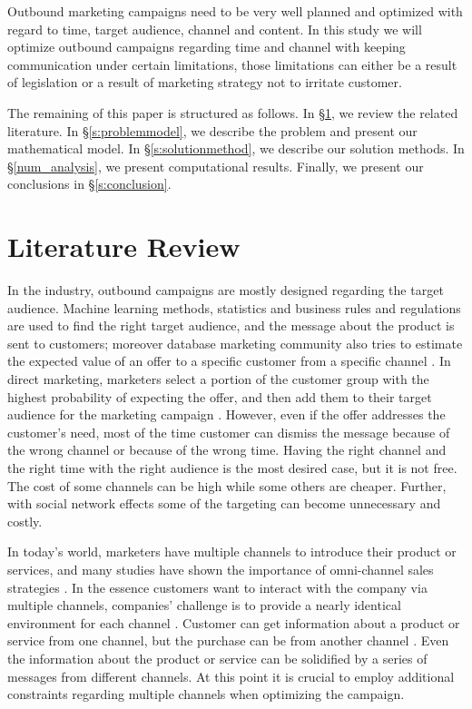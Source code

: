 \documentclass[11pt]{article}
\begin{document}
Outbound marketing campaigns need to be very well planned and optimized with regard to time, target audience, channel and content. In this study we will optimize outbound campaigns regarding time and channel with keeping communication under certain limitations, those limitations can either be a result of legislation or a result of marketing strategy not to irritate customer.

The remaining of this paper is structured as follows. In \S \ref{s:literature_review}, we review the related literature. In \S \ref{s:problemmodel}, we describe the problem and present our mathematical model. In \S \ref{s:solutionmethod}, we describe our solution methods. In \S \ref{num_analysis}, we present computational results. Finally, we present our conclusions in \S \ref{s:conclusion}.




\section{Literature Review}  \label{s:literature_review}

In the industry, outbound campaigns are mostly designed regarding the target audience. Machine learning methods, statistics and business rules and regulations are used to find the right target audience, and the message about the product is sent to customers; moreover database marketing community also tries to estimate the expected value of an offer to a specific customer from a specific channel \citep{cohen_exp, oliveira_hypr}. In direct marketing, marketers select a portion of the customer group with the highest probability of expecting the offer, and then add them to their target audience for the marketing campaign \citep{owczarczuk}. However, even if the offer addresses the customer’s need, most of the time customer can dismiss the message because of the wrong channel or because of the wrong time. Having the right channel and the right time with the right audience is the most desired case, but it is not free. The cost of some channels can be high while some others are cheaper. Further, with social network effects some of the targeting can become unnecessary and costly.

In today’s world, marketers have multiple channels to introduce their product or services, and many studies have shown the importance of omni-channel sales strategies \citep{shankar, park}. In the essence customers want to interact with the company via multiple channels, companies’ challenge is to provide a nearly identical environment for each channel \citep{bell}. Customer can get information about a product or service from one channel, but the purchase can be from another channel \citep{park}. Even the information about the product or service can be solidified by a series of messages from different channels. At this point it is crucial to employ additional constraints regarding multiple channels when optimizing the campaign.
\end{document}
